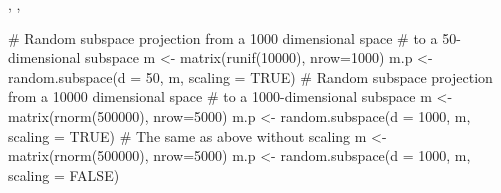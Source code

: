 \documentclass{article}
\begin{document}
\begin{SeeAlso}\relax
{}, ,

\end{SeeAlso}
\begin{Examples}
\begin{ExampleCode}
# Random subspace projection from a 1000 dimensional space 
# to a 50-dimensional subspace
m <- matrix(runif(10000), nrow=1000)
m.p <- random.subspace(d = 50, m, scaling = TRUE)
# Random subspace projection from a 10000 dimensional space 
# to a 1000-dimensional subspace
m <- matrix(rnorm(500000), nrow=5000)
m.p <- random.subspace(d = 1000, m, scaling = TRUE)
# The same as above without scaling
m <- matrix(rnorm(500000), nrow=5000)
m.p <- random.subspace(d = 1000, m, scaling = FALSE)
\end{ExampleCode}
\end{Examples}
\end{document}
